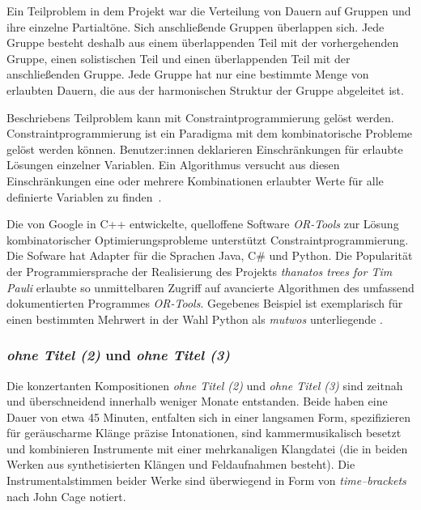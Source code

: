\documentclass[12pt,a4paper,ngerman]{article}
\begin{document}
Ein Teilproblem in dem Projekt war die Verteilung von Dauern auf Gruppen und ihre einzelne Partialtöne.
Sich anschließende Gruppen überlappen sich.
Jede Gruppe besteht deshalb aus einem überlappenden Teil mit der vorhergehenden Gruppe, einen solistischen Teil und einen überlappenden Teil mit der anschließenden Gruppe.
Jede Gruppe hat nur eine bestimmte Menge von erlaubten Dauern, die aus der harmonischen Struktur der Gruppe abgeleitet ist.

\bigskip

Beschriebens Teilproblem kann mit Constraintprogrammierung gelöst werden.
Constraintprogrammierung ist ein Paradigma mit dem kombinatorische Probleme gelöst werden können.
Benutzer:innen deklarieren Einschränkungen für erlaubte Lösungen einzelner Variablen.
Ein Algorithmus versucht aus diesen Einschränkungen eine oder mehrere Kombinationen erlaubter Werte für alle definierte Variablen zu finden~\parencite{constraintProgramming}.

\bigskip

Die von Google in C++ entwickelte, quelloffene Software \emph{OR-Tools} zur Lösung kombinatorischer Optimierungsprobleme unterstützt Constraintprogrammierung.
Die Sofware hat Adapter für die Sprachen Java, C\# und Python.
Die Popularität der Programmiersprache der Realisierung des Projekts \emph{thanatos trees for Tim Pauli} erlaubte so unmittelbaren Zugriff auf avancierte Algorithmen des umfassend dokumentierten Programmes \emph{OR-Tools}.
Gegebenes Beispiel ist exemplarisch für einen bestimmten Mehrwert in der Wahl Python als \emph{mutwos} unterliegende \emph{}.


%
%



\subsubsection{\emph{ohne Titel (2)} und \emph{ohne Titel (3)}}

Die konzertanten Kompositionen \emph{ohne Titel (2)} und \emph{ohne Titel (3)} sind zeitnah und überschneidend innerhalb weniger Monate entstanden.
Beide haben eine Dauer von etwa 45 Minuten, entfalten sich in einer langsamen Form, spezifizieren für geräuscharme Klänge präzise Intonationen, sind kammermusikalisch besetzt und kombinieren Instrumente mit einer mehrkanaligen Klangdatei (die in beiden Werken aus synthetisierten Klängen und Feldaufnahmen besteht).
Die Instrumentalstimmen beider Werke sind überwiegend in Form von \emph{time--brackets} nach John Cage notiert.
\end{document}
